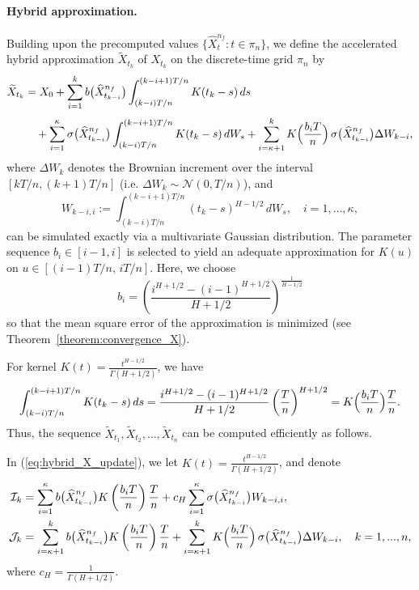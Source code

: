 \documentclass[11pt]{article}%
\theoremstyle{definition}
\begin{document}
    \paragraph{Hybrid approximation.} Building upon the precomputed values \(\{\widehat{X}_t^{n_f} : t \in \pi_n\}\), we define the accelerated hybrid approximation \(\widetilde{X}_{t_k}\) of \(X_{t_k}\) on the discrete-time grid \(\pi_n\) by
    \begin{align}
        \widetilde{X}_{t_k} &= X_0 + \sum_{i=1}^{k} b\bigl(\widehat{X}_{t_{k-i}}^{n_f}\bigr) \int_{(k-i)T/n}^{(k-i+1)T/n} K(t_k-s)\,ds \nonumber\\[1mm]
        &\quad + \sum_{i=1}^{\kappa} \sigma\bigl(\widehat{X}_{t_{k-i}}^{n_f}\bigr)
        \int_{(k-i)T/n}^{(k-i+1)T/n} K(t_k-s)\,dW_s
        + \sum_{i=\kappa+1}^{k} K\Bigl(\frac{b_{i}T}{n}\Bigr)\, \sigma\bigl(\widehat{X}_{t_{k-i}}^{n_f}\bigr) \Delta W_{k-i}, \label{eq:hybrid_X_update}
    \end{align}
    where \(\Delta W_k\) denotes the Brownian increment over the interval \([kT/n,(k+1)T/n]\) (i.e. \(\Delta W_k \sim \mathcal{N}(0,T/n)\)), and 
    \[
    W_{k-i,i} := \int_{(k-i)T/n}^{(k-i+1)T/n} (t_k-s)^{H-1/2} \,dW_s,\quad i=1,\ldots,\kappa,
    \]
    can be simulated exactly via a multivariate Gaussian distribution. The parameter sequence \(b_i \in [i-1,i]\) is selected to yield an adequate approximation for \(K(u)\) on \(u \in [(i-1)T/n,\,iT/n]\). Here, we choose 
    \begin{equation}
        b_i = \left(\frac{i^{H+1/2} - (i-1)^{H+1/2}}{H+1/2}\right)^{\frac{1}{H-1/2}}\label{eq:seq_b_choice}
    \end{equation} 
    so that the mean square error of the approximation is minimized (see Theorem~\ref{theorem:convergence_X}). 

    For kernel \(K(t)=\frac{t^{H-1/2}}{\Gamma(H+1/2)}\), we have
    \[
    \int_{(k-i)T/n}^{(k-i+1)T/n} K(t_k-s)\,ds = \frac{i^{H+1/2} - (i-1)^{H+1/2}}{H+1/2}\left(\frac{T}{n}\right)^{H+1/2} = K\Bigl(\frac{b_iT}{n}\Bigr)\frac{T}{n}.
    \]
    Thus, the sequence \(\widetilde{X}_{t_1}, \widetilde{X}_{t_2}, \dots, \widetilde{X}_{t_n}\) can be computed efficiently as follows.
    
    In (\ref{eq:hybrid_X_update}), we let \(K(t) = \tfrac{t^{H-1/2}}{\Gamma(H+1/2)}\), and denote 
    \begin{align}
        \mathcal{I}_k &= \sum_{i=1}^{\kappa} b\bigl(\widehat{X}_{t_{k-i}}^{n_f}\bigr) K\left(\frac{b_i T}{n}\right)\frac{T}{n} + c_H \sum_{i=1}^{\kappa} \sigma\bigl(\widehat{X}_{t_{k-i}}^{n_f}\bigr) W_{k-i,i},\label{eq:I_k}\\
        \mathcal{J}_k &= \sum_{i=\kappa+1}^{k} b\bigl(\widehat{X}_{t_{k-i}}^{n_f}\bigr) K\left(\frac{b_i T}{n}\right)\frac{T}{n} + \sum_{i=\kappa+1}^{k} K\Bigl(\frac{b_{i}T}{n}\Bigr)\, \sigma\bigl(\widehat{X}_{t_{k-i}}^{n_f}\bigr) \Delta W_{k-i},\quad k=1,...,n,\label{eq:J_k}
    \end{align}
    where \(c_H = \tfrac{1}{\Gamma(H+1/2)}\). 
    
\end{document}
